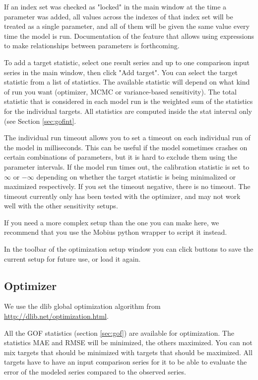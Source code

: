 \documentclass[11pt]{article}
\theoremstyle{definition}
\begin{document}
If an index set was checked as "locked" in the main window at the time a parameter was added, all values across the indexes of that index set will be treated as a single parameter, and all of them will be given the same value every time the model is run. Documentation of the feature that allows using expressions to make relationships between parameters is forthcoming.

To add a target statistic, select one result series and up to one comparison input series in the main window, then click "Add target". You can select the target statistic from a list of statistics. The available statistic will depend on what kind of run you want (optimizer, MCMC or variance-based sensitivity). The total statistic that is considered in each model run is the weighted sum of the statistics for the individual targets. All statistics are computed inside the stat interval only (see Section \ref{sec:gofint}.

The individual run timeout allows you to set a timeout on each individual run of the model in milliseconds. This can be useful if the model sometimes crashes on certain combinations of parameters, but it is hard to exclude them using the parameter intervals. If the model run times out, the calibration statistic is set to $\infty$ or $-\infty$ depending on whether the target statistic is being minimalized or maximized respectively. If you set the timeout negative, there is no timeout. The timeout currently only has been tested with the optimizer, and may not work well with the other sensitivity setups.

If you need a more complex setup than the one you can make here, we recommend that you use the Mobius python wrapper to script it instead.

In the toolbar of the optimization setup window you can click buttons to save the current setup for future use, or load it again.

\subsection{Optimizer}

We use the dlib global optimization algorithm from \url{http://dlib.net/optimization.html}.

All the GOF statistics (section \ref{sec:gof}) are available for optimization. The statistics MAE and RMSE will be minimized, the others maximized. You can not mix targets that should be minimized with targets that should be maximized. All targets have to have an input comparison series for it to be able to evaluate the error of the modeled series compared to the observed series.
\end{document}

